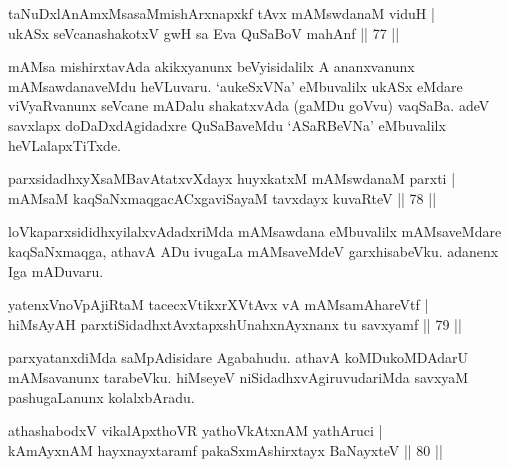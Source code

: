 
\begin{shl}
taNuDxlAnAmxMsasaMmishArxnapxkf tAvx mAMswdanaM viduH | \\
ukASx seVcanashakotxV gwH sa Eva QuSaBoV mahAnf \hfill|| 77 || 
\end{shl}

\begin{artha}
mAMsa mishirxtavAda akikxyanunx beVyisidalilx A ananxvanunx 
mAMsawdanaveMdu heVLuvaru. `aukeSxVNa' eMbuvalilx ukASx eMdare 
viVyaRvanunx seVcane mADalu shakatxvAda (gaMDu goVvu) vaqSaBa. adeV 
savxlapx doDaDxdAgidadxre QuSaBaveMdu `ASaRBeVNa' eMbuvalilx 
heVLalapxTiTxde.
\end{artha}


\begin{shl}
parxsidadhxyXsaMBavAtatxvXdayx huyxkatxM mAMswdanaM parxti | \\
mAMsaM kaqSaNxmaqgacACxgaviSayaM tavxdayx kuvaRteV \hfill|| 78 || 
\end{shl}

\begin{artha}
loVkaparxsididhxyilalxvAdadxriMda mAMsawdana eMbuvalilx mAMsaveMdare 
kaqSaNx\-maqga, athavA ADu ivugaLa mAMsaveMdeV garxhisabeVku. adanenx 
Iga mADuvaru.
\end{artha}


\begin{shl}
yatenxVnoVpAjiRtaM tacecxVtikxrXVtAvx vA mAMsamAhareVtf | \\
hiMsAyAH parxtiSidadhxtAvxtapxshUnahxnAyxnanx tu savxyamf \hfill|| 79 || 
\end{shl}

\begin{artha}
parxyatanxdiMda saMpAdisidare Agabahudu. athavA koMDukoMDAdarU 
mAMsavanunx tarabeVku. hiMseyeV niSidadhxvAgiruvudariMda savxyaM 
pashugaLanunx kolalxbAradu.
\end{artha}


\begin{shl}
athashabodxV vikalApxthoVR yathoVkAtxnAM yathAruci | \\
kAmAyxnAM hayxnayxtaramf pakaSxmAshirxtayx BaNayxteV \hfill|| 80 || 
\end{shl}

